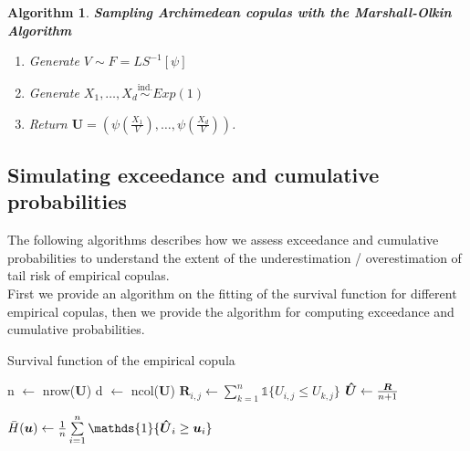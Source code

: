 \documentclass[12pt]{report}
\newtheorem{algorithmold}{Algorithm}[section]
\newcommand{\1}{\mathbf{1}}
\begin{document}
\begin{flushleft}
\begin{algorithmold}\label{MarshallOlkinAlgo}
\textit{\normalfont\parencite{MarshallOlkinAlgo1988}}\:
\textbf{Sampling Archimedean copulas with the Marshall-Olkin Algorithm}\\
\begin{enumerate}
\item Generate $V \sim F = LS^{-1}[\psi]$
\item Generate $X_{1}, \dots, X_{d} \overset{\text{ind.}}{\sim} Exp(1)$
\item Return $\textbf{U} = \left( \psi \left( \frac{X_{1}}{V} \right), \dots, \psi \left( \frac{X_{d}}{V} \right) \right)$.
\end{enumerate}
\end{algorithmold}

\subsection{Simulating exceedance and cumulative probabilities}
\vspace{0.5cm}
The following algorithms describes how we assess exceedance and cumulative probabilities to understand the extent of the underestimation / overestimation of tail risk of empirical copulas. \\
\vspace{0.5cm}
First we provide an algorithm on the fitting of the survival function for different empirical copulas, then we provide the algorithm for computing exceedance and cumulative probabilities.\\
\newpage
\begin{algorithm}[H]
\caption{Survival function of the empirical copula}
\begin{algorithmic}
    \State n $\gets$ nrow($\boldsymbol{U}$) 
    \State d $\gets$ ncol($\boldsymbol{U}$) 
            \State $\boldsymbol{R}_{i,j} \gets \sum\limits_{k = 1}^{n} \mathds{1} \{ U_{i,j} \le U_{k,j} \}$
        \EndFor
    \EndFor
    \State $\boldsymbol{\Hat{U}} \gets \frac{\boldsymbol{R}}{n + 1}$ 
    
    \State $ \Bar{H}(\boldsymbol{u}) \gets \frac{1}{n} \sum\limits_{i = 1}^{n} \mathds{1}\{\boldsymbol{\Hat{U}}_{i} \ge \boldsymbol{u}_{i}\}$ 
    

\end{algorithmic}
\end{algorithm}
\end{flushleft}
\end{document}
